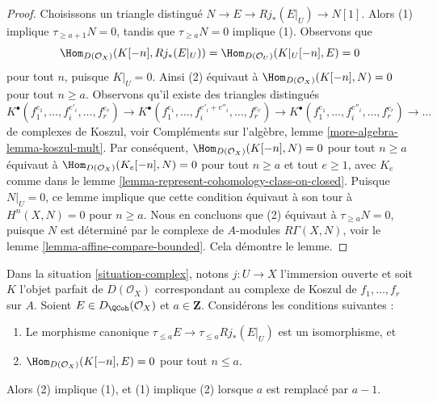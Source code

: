 \begin{proof}
Choisissons un triangle distingué $N \to E \to Rj_*(E|_U) \to N[1]$.
Alors (1) implique $\tau_{\geq a + 1} N = 0$, tandis que
$\tau_{\geq a}N = 0$ implique (1). Observons que
$$
\Hom_{D(\mathcal{O}_X)}(K[-n], Rj_*(E|_U)) =
\Hom_{D(\mathcal{O}_U)}(K|_U[-n], E) = 0
$$
pour tout $n$, puisque $K|_U = 0$. Ainsi (2) équivaut à
$\Hom_{D(\mathcal{O}_X)}(K[-n], N) = 0$ pour tout $n \geq a$. 
Observons qu'il existe des triangles distingués
$$
K^\bullet(f_1^{e_1}, \ldots, f_i^{e'_i}, \ldots, f_r^{e_r}) \to
K^\bullet(f_1^{e_1}, \ldots, f_i^{e'_i + e''_i}, \ldots, f_r^{e_r}) \to
K^\bullet(f_1^{e_1}, \ldots, f_i^{e''_i}, \ldots, f_r^{e_r}) \to \ldots
$$
de complexes de Koszul, voir
Compléments sur l'algèbre, lemme \ref{more-algebra-lemma-koszul-mult}. Par conséquent,
$\Hom_{D(\mathcal{O}_X)}(K[-n], N) = 0$ pour tout $n \geq a$
équivaut à
$\Hom_{D(\mathcal{O}_X)}(K_e[-n], N) = 0$ pour tout $n \geq a$ et
tout $e \geq 1$, avec $K_e$ comme dans le
lemme \ref{lemma-represent-cohomology-class-on-closed}.
Puisque $N|_U = 0$, ce lemme implique que cette condition équivaut à son tour à
$H^n(X, N) = 0$ pour $n \geq a$. Nous en concluons que (2) équivaut
à $\tau_{\geq a}N = 0$, puisque $N$ est déterminé par le complexe de
$A$-modules $R\Gamma(X, N)$, voir le lemme \ref{lemma-affine-compare-bounded}.
Cela démontre le lemme.
\end{proof}

\begin{lemma}
\label{lemma-orthogonal-koszul-second-variant}
Dans la situation \ref{situation-complex}, notons $j : U \to X$ l'immersion
ouverte et soit $K$ l'objet parfait de $D(\mathcal{O}_X)$
correspondant au complexe de Koszul de $f_1, \ldots, f_r$ sur $A$.
Soient $E \in D_\QCoh(\mathcal{O}_X)$ et $a \in \mathbf{Z}$. Considérons
les conditions suivantes :
\begin{enumerate}
\item Le morphisme canonique $\tau_{\leq a}E \to \tau_{\leq a} Rj_*(E|_U)$
est un isomorphisme, et
\item $\Hom_{D(\mathcal{O}_X)}(K[-n], E) = 0$ pour tout $n \leq a$.
\end{enumerate}
Alors (2) implique (1), et (1) implique (2) lorsque $a$ est remplacé par $a - 1$.
\end{lemma}

